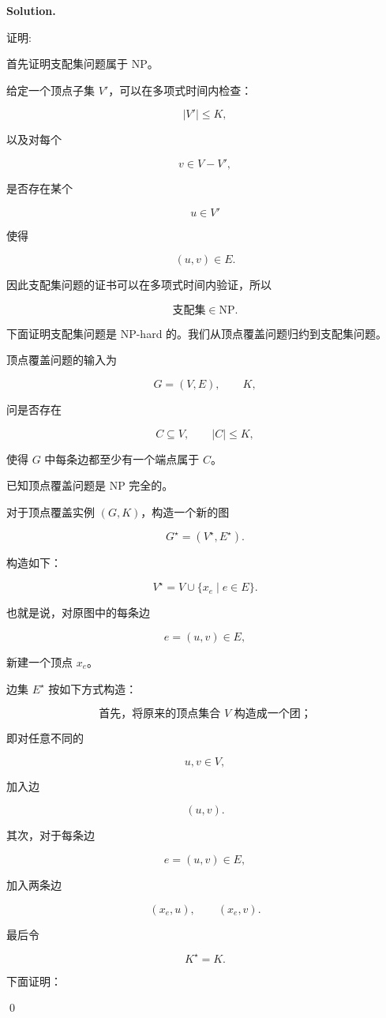 \documentclass[11pt]{article}
\newenvironment{solution}{
\par\noindent\textbf{Solution.}\par\noindent
}{\qed}
\begin{document}
\begin{solution}
证明:

首先证明支配集问题属于 NP。

给定一个顶点子集 \(V'\)，可以在多项式时间内检查：

\[
|V'|\leq K,
\]

以及对每个

\[
v\in V-V',
\]

是否存在某个

\[
u\in V'
\]

使得

\[
(u,v)\in E.
\]

因此支配集问题的证书可以在多项式时间内验证，所以

\[
\text{支配集}\in \mathrm{NP}.
\]

下面证明支配集问题是 NP-hard 的。我们从顶点覆盖问题归约到支配集问题。

顶点覆盖问题的输入为

\[
G=(V,E),\qquad K,
\]

问是否存在

\[
C\subseteq V,\qquad |C|\leq K,
\]

使得 \(G\) 中每条边都至少有一个端点属于 \(C\)。

已知顶点覆盖问题是 NP 完全的。

对于顶点覆盖实例 \((G,K)\)，构造一个新的图

\[
G^\star=(V^\star,E^\star).
\]

构造如下：

\[
V^\star = V \cup \{x_e\mid e\in E\}.
\]

也就是说，对原图中的每条边

\[
e=(u,v)\in E,
\]

新建一个顶点 \(x_e\)。

边集 \(E^\star\) 按如下方式构造：

\[
\text{首先，将原来的顶点集合 } V \text{ 构造成一个团；}
\]

即对任意不同的

\[
u,v\in V,
\]

加入边

\[
(u,v).
\]

其次，对于每条边

\[
e=(u,v)\in E,
\]

加入两条边

\[
(x_e,u),\qquad (x_e,v).
\]

最后令

\[
K^\star=K.
\]

下面证明：


\end{solution}
\end{document}
